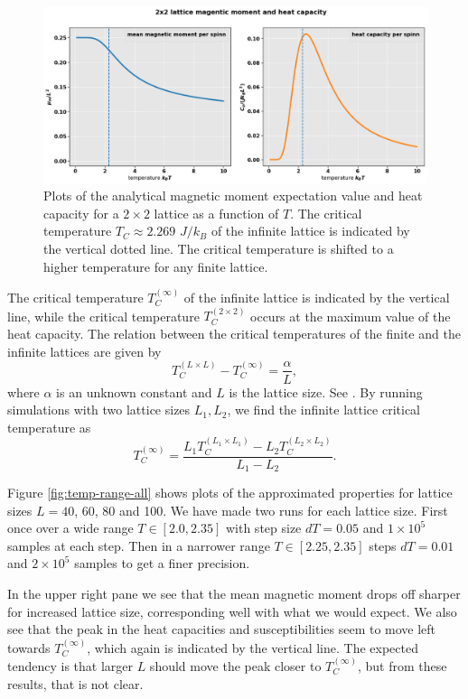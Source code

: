 \documentclass[]{article}
\begin{document}
\begin{figure}[!h]
	\centering
	\includegraphics[width=1\linewidth]{./figs/2x2-mum-cv.png}
	\caption{Plots of the analytical magnetic moment expectation value and heat capacity for a $2 \times 2$ lattice as a function of $T$. The critical temperature $T_C \approx 2.269$ $J/k_B$ of the infinite lattice is indicated by the vertical dotted line. The critical temperature is shifted to a higher temperature for any finite lattice.}
	\label{fig:2x2-mum-cv}
\end{figure}

The critical temperature $T_C^{(\infty)}$ of the infinite lattice is indicated by the vertical line, while the critical temperature $T_C^{(2 \times 2)}$ occurs at the maximum value of the heat capacity. The relation between the critical temperatures of the finite and the infinite lattices are given by
\begin{equation}
	T_C^{(L \times L)} - T_C^{(\infty)} = \frac{\alpha}{L},
\end{equation}
where $\alpha$ is an unknown constant and $L$ is the lattice size. See \cite{fys4150-p4}. By running simulations with two lattice sizes $L_1, L_2$, we find the infinite lattice critical temperature as 
\begin{equation}
	T_C^{(\infty)} = \frac{L_1 T_C^{(L_1 \times L_1)} - L_2 T_C^{(L_2 \times L_2)}}{L_1 - L_2}.
\end{equation}

Figure \ref{fig:temp-range-all} shows plots of the approximated properties for lattice sizes $L=40$, 60, 80 and 100. We have made two runs for each lattice size. First once over a wide range $T \in [2.0, 2.35]$ with step size $dT = 0.05$ and $1 \times 10^5$ samples at each step. Then in a narrower range $T \in [2.25, 2.35]$ steps $dT = 0.01$ and $2 \times 10^5$ samples to get a finer precision. 

In the upper right pane we see that the mean magnetic moment drops off sharper for increased lattice size, corresponding well with what we would expect. We also see that the peak in the heat capacities and susceptibilities seem to move left towards $T_C^{(\infty)}$, which again is indicated by the vertical line. The expected tendency is that larger $L$ should move the peak closer to $T_C^{(\infty)}$, but from these results, that is not clear.
\end{document}
